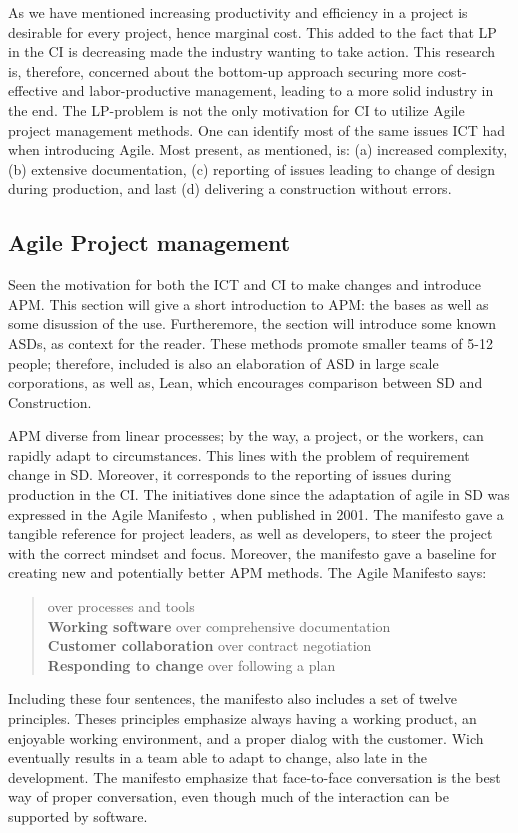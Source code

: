 As we have mentioned increasing productivity and efficiency in a project is desirable for every project, hence marginal cost. This added to the fact that LP in the CI is decreasing made the industry wanting to take action. This research is, therefore, concerned about the bottom-up approach securing more cost-effective and labor-productive management, leading to a more solid industry in the end. The LP-problem is not the only motivation for CI to utilize Agile project management methods. One can identify most of the same issues ICT had when introducing Agile. Most present, as mentioned, is: (a) increased complexity, (b) extensive documentation, (c) reporting of issues leading to change of design during production, and last (d) delivering a construction without errors.

\subsection{Agile Project management}
Seen the motivation for both the ICT and CI to make changes and introduce APM. This section will give a short introduction to APM: the bases as well as some disussion of the use. Furtheremore, the section will introduce some known ASDs, as context for the reader. These methods promote smaller teams of 5-12 people; therefore, included is also an elaboration of ASD in large scale corporations, as well as, Lean, which encourages comparison between SD and Construction. 

APM diverse from linear processes; by the way, a project, or the workers, can rapidly adapt to circumstances. This lines with the problem of requirement change in SD. Moreover, it corresponds to the reporting of issues during production in the CI. The initiatives done since the adaptation of agile in SD was expressed in the Agile Manifesto \cite{agile_manifesto}, when published in 2001. The manifesto gave a tangible reference for project leaders, as well as developers, to steer the project with the correct mindset and focus. Moreover, the manifesto gave a baseline for creating new and potentially better APM methods. The Agile Manifesto says:
\begin{quotation}
     over processes and tools \\
    {\bf Working software} over comprehensive documentation \\
    {\bf Customer collaboration} over contract negotiation \\
    {\bf Responding to change} over following a plan \\
\end{quotation}
Including these four sentences, the manifesto also includes a set of twelve principles. Theses principles emphasize always having a working product, an enjoyable working environment, and a proper dialog with the customer. Wich eventually results in a team able to adapt to change,  also late in the development. The manifesto emphasize that face-to-face conversation is the best way of proper conversation, even though much of the interaction can be supported by software.

